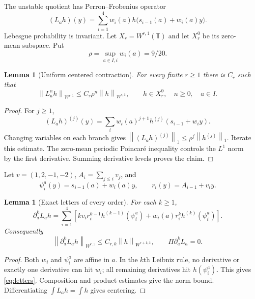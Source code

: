 \documentclass[11pt,reqno]{amsart}
\newtheorem{lemma}[theorem]{Lemma}
\theoremstyle{definition}
\theoremstyle{remark}
\newcommand{\T}{\mathbb T}
\newcommand{\Piop}{\Pi}
\newcommand{\norm}[1]{\left\lVert #1\right\rVert}
\begin{document}
The unstable quotient has Perron--Frobenius operator
\begin{equation}\label{eq:L}
 (L_ah)(y)=\sum_{i=1}^4w_i(a)
 h\bigl(s_{i-1}(a)+w_i(a)y\bigr).
\end{equation}
Lebesgue probability is invariant.  Let $X_r=W^{r,1}(\T)$ and let $X_r^0$
be its zero-mean subspace.  Put
\[
 \rho=\sup_{a\in I,i}w_i(a)=9/20.
\]

\begin{lemma}[Uniform centered contraction]\label{lem:contraction}
For every finite $r\ge1$ there is $C_r$ such that
\[
 \norm{L_a^nh}_{W^{r,1}}
 \le C_r\rho^n\norm h_{W^{r,1}},
 \qquad h\in X_r^0,\quad n\ge0,\quad a\in I.
\]
\end{lemma}

\begin{proof}
For $j\ge1$,
\[
 (L_ah)^{(j)}(y)=
 \sum_iw_i(a)^{j+1}h^{(j)}(s_{i-1}+w_i y).
\]
Changing variables on each branch gives
$\norm{(L_ah)^{(j)}}_1\le\rho^j\norm{h^{(j)}}_1$.  Iterate this estimate.
The zero-mean periodic Poincar\'e inequality controls the $L^1$ norm by the
first derivative.  Summing derivative levels proves the claim.
\end{proof}

Let $v=(1,2,-1,-2)$, $A_i=\sum_{j\le i}v_j$, and
\[
 \psi_i^a(y)=s_{i-1}(a)+w_i(a)y,
 \qquad r_i(y)=A_{i-1}+v_i y.
\]

\begin{lemma}[Exact letters of every order]\label{lem:letters}
For each $k\ge1$,
\begin{equation}\label{eq:letters}
 \partial_a^kL_ah=
 \sum_{i=1}^4\left[
 k v_i r_i^{k-1}h^{(k-1)}(\psi_i^a)
 +w_i(a)r_i^kh^{(k)}(\psi_i^a)
 \right].
\end{equation}
Consequently
\[
 \norm{\partial_a^kL_ah}_{W^{r,1}}
 \le C_{r,k}\norm h_{W^{r+k,1}},
 \qquad \Piop\partial_a^kL_a=0.
\]
\end{lemma}

\begin{proof}
Both $w_i$ and $\psi_i^a$ are affine in $a$.  In the $k$th Leibniz rule,
no derivative or exactly one derivative can hit $w_i$; all remaining
derivatives hit $h(\psi_i^a)$.  This gives \eqref{eq:letters}.  Composition
and product estimates give the norm bound.  Differentiating
$\int L_ah=\int h$ gives centering.
\end{proof}
\end{document}
